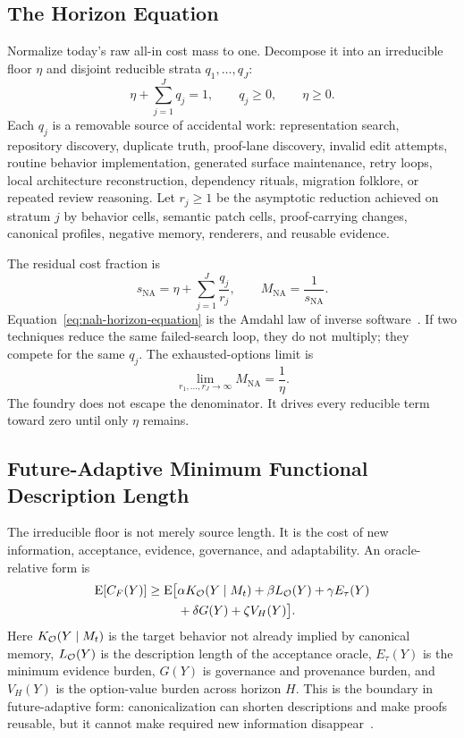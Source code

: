 \subsection{The Horizon Equation}

Normalize today's raw all-in cost mass to one. Decompose it into an irreducible floor $\eta$ and disjoint reducible strata $q_1,\ldots,q_J$:
\begin{equation}
\eta+\sum_{j=1}^{J}q_j=1,
\qquad
q_j\ge 0,
\qquad
\eta\ge 0.
\label{eq:nah-cost-partition}
\end{equation}
Each $q_j$ is a removable source of accidental work: representation search, repository discovery, duplicate truth, proof-lane discovery, invalid edit attempts, routine behavior implementation, generated surface maintenance, retry loops, local architecture reconstruction, dependency rituals, migration folklore, or repeated review reasoning. Let $r_j\ge 1$ be the asymptotic reduction achieved on stratum $j$ by behavior cells, semantic patch cells, proof-carrying changes, canonical profiles, negative memory, renderers, and reusable evidence.

The residual cost fraction is
\begin{equation}
s_{\mathrm{NA}}=\eta+\sum_{j=1}^{J}\frac{q_j}{r_j},
\qquad
M_{\mathrm{NA}}=\frac{1}{s_{\mathrm{NA}}}.
\label{eq:nah-horizon-equation}
\end{equation}
Equation~\ref{eq:nah-horizon-equation} is the Amdahl law of inverse software~\cite{amdahl1967validity}. If two techniques reduce the same failed-search loop, they do not multiply; they compete for the same $q_j$. The exhausted-options limit is
\begin{equation}
\lim_{r_1,\ldots,r_J\rightarrow\infty}M_{\mathrm{NA}}=\frac{1}{\eta}.
\label{eq:nah-final-limit}
\end{equation}
The foundry does not escape the denominator. It drives every reducible term toward zero until only $\eta$ remains.

\subsection{Future-Adaptive Minimum Functional Description Length}

The irreducible floor is not merely source length. It is the cost of new information, acceptance, evidence, governance, and adaptability. An oracle-relative form is
\begin{align}
\mathrm{E}[C_F(Y)]\ge
\mathrm{E}\big[&\alpha K_{\mathcal{O}}(Y\mid M_t)
+\beta L_{\mathcal{O}}(Y)
+\gamma E_{\tau}(Y) \notag\\
&+\delta G(Y)+\zeta V_H(Y)\big].
\label{eq:nah-info-floor}
\end{align}
Here $K_{\mathcal{O}}(Y\mid M_t)$ is the target behavior not already implied by canonical memory, $L_{\mathcal{O}}(Y)$ is the description length of the acceptance oracle, $E_{\tau}(Y)$ is the minimum evidence burden, $G(Y)$ is governance and provenance burden, and $V_H(Y)$ is the option-value burden across horizon $H$. This is the \mfdl{} boundary in future-adaptive form: canonicalization can shorten descriptions and make proofs reusable, but it cannot make required new information disappear~\cite{grunwaldMDL,liVitanyi2008}.

